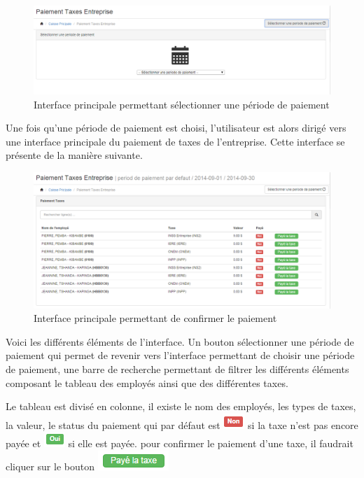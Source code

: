 \documentclass[12pt,a4paper]{report}
\begin{document}
\begin{figure}[h]
\begin{center}
\includegraphics[width=14cm]{pic/PaieTaxesEntre.png}
\end{center}
\caption{Interface principale permettant sélectionner une période de paiement}
\label{Interface principale permettant sélectionner une période de paiement}
\end{figure}

Une fois qu'une période de paiement est choisi, l'utilisateur est alors dirigé vers une interface principale du paiement de taxes de l'entreprise. Cette interface se présente de la manière suivante.

\begin{figure}[h]
\begin{center}
\includegraphics[width=14cm]{pic/PaieTaxesEntre2.png}
\end{center}
\caption{Interface principale permettant de confirmer le paiement}
\label{Interface principale permettant de confirmer le paiement}
\end{figure}


Voici les différents éléments de l'interface. Un bouton sélectionner une période de paiement qui permet de revenir vers l'interface permettant de choisir une période de paiement, une barre de recherche permettant de filtrer les différents éléments composant le tableau des employés ainsi que des différentes taxes.

Le tableau est divisé en colonne, il existe le nom des employés, les types de taxes, la valeur, le status du paiement qui par défaut est \includegraphics[scale=0.7]{pic/NonTaxes.png} si la taxe n'est pas encore payée et \includegraphics[scale=0.7]{pic/OuiTaxes.png} si elle est payée. pour confirmer le paiement d'une taxe, il faudrait cliquer sur le bouton \includegraphics[scale=0.7]{pic/PayeTaxe.png}
\end{document}
